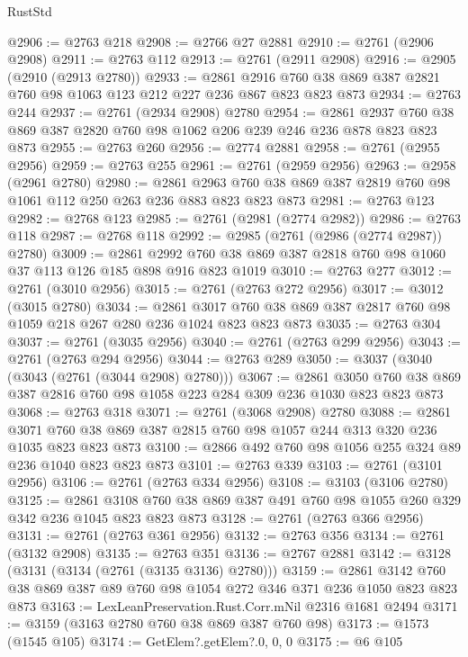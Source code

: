 \begin{lexlean}{RustStd}
\begin{coremodule}
@2906 := @2763 @218
@2908 := @2766 @27 @2881
@2910 := @2761 (@2906 @2908)
@2911 := @2763 @112
@2913 := @2761 (@2911 @2908)
@2916 := @2905 (@2910 (@2913 @2780))
@2933 := @2861 @2916 @760 @38 @869 @387 @2821 @760 @98 @1063 @123 @212 @227 @236 @867 @823 @823 @873
@2934 := @2763 @244
@2937 := @2761 (@2934 @2908) @2780
@2954 := @2861 @2937 @760 @38 @869 @387 @2820 @760 @98 @1062 @206 @239 @246 @236 @878 @823 @823 @873
@2955 := @2763 @260
@2956 := @2774 @2881
@2958 := @2761 (@2955 @2956)
@2959 := @2763 @255
@2961 := @2761 (@2959 @2956)
@2963 := @2958 (@2961 @2780)
@2980 := @2861 @2963 @760 @38 @869 @387 @2819 @760 @98 @1061 @112 @250 @263 @236 @883 @823 @823 @873
@2981 := @2763 @123
@2982 := @2768 @123
@2985 := @2761 (@2981 (@2774 @2982))
@2986 := @2763 @118
@2987 := @2768 @118
@2992 := @2985 (@2761 (@2986 (@2774 @2987)) @2780)
@3009 := @2861 @2992 @760 @38 @869 @387 @2818 @760 @98 @1060 @37 @113 @126 @185 @898 @916 @823 @1019
@3010 := @2763 @277
@3012 := @2761 (@3010 @2956)
@3015 := @2761 (@2763 @272 @2956)
@3017 := @3012 (@3015 @2780)
@3034 := @2861
    @3017
    @760
    @38
    @869
    @387
    @2817
    @760
    @98
    @1059
    @218
    @267
    @280
    @236
    @1024
    @823
    @823
    @873
@3035 := @2763 @304
@3037 := @2761 (@3035 @2956)
@3040 := @2761 (@2763 @299 @2956)
@3043 := @2761 (@2763 @294 @2956)
@3044 := @2763 @289
@3050 := @3037 (@3040 (@3043 (@2761 (@3044 @2908) @2780)))
@3067 := @2861
    @3050
    @760
    @38
    @869
    @387
    @2816
    @760
    @98
    @1058
    @223
    @284
    @309
    @236
    @1030
    @823
    @823
    @873
@3068 := @2763 @318
@3071 := @2761 (@3068 @2908) @2780
@3088 := @2861
    @3071
    @760
    @38
    @869
    @387
    @2815
    @760
    @98
    @1057
    @244
    @313
    @320
    @236
    @1035
    @823
    @823
    @873
@3100 := @2866 @492 @760 @98 @1056 @255 @324 @89 @236 @1040 @823 @823 @873
@3101 := @2763 @339
@3103 := @2761 (@3101 @2956)
@3106 := @2761 (@2763 @334 @2956)
@3108 := @3103 (@3106 @2780)
@3125 := @2861 @3108 @760 @38 @869 @387 @491 @760 @98 @1055 @260 @329 @342 @236 @1045 @823 @823 @873
@3128 := @2761 (@2763 @366 @2956)
@3131 := @2761 (@2763 @361 @2956)
@3132 := @2763 @356
@3134 := @2761 (@3132 @2908)
@3135 := @2763 @351
@3136 := @2767 @2881
@3142 := @3128 (@3131 (@3134 (@2761 (@3135 @3136) @2780)))
@3159 := @2861 @3142 @760 @38 @869 @387 @89 @760 @98 @1054 @272 @346 @371 @236 @1050 @823 @823 @873
@3163 := LexLeanPreservation.Rust.Corr.mNil @2316 @1681 @2494
@3171 := @3159 (@3163 @2780 @760 @38 @869 @387 @760 @98)
@3173 := @1573 (@1545 @105)
@3174 := GetElem?.getElem?.{0, 0, 0}
@3175 := @6 @105

\end{coremodule}
\end{lexlean}
